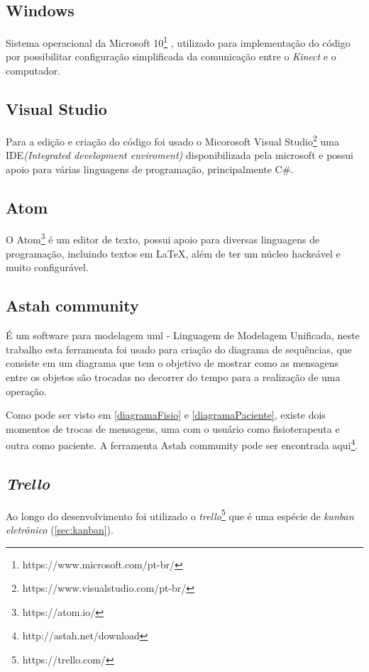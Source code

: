     \subsection{Windows}\label{sub:windows}
    Sistema operacional da Microsoft 10\footnote{https://www.microsoft.com/pt-br/} , utilizado para implementação do código
    por possibilitar configuração simplificada da comunicação entre o \textit{Kinect} e o computador.

     \subsection{Visual Studio}\label{sub:codigo}
       Para a edição e criação do código foi usado o Micorosoft Visual Studio\footnote{https://www.visualstudio.com/pt-br/} uma IDE\textit{(Integrated development enviroment)} disponibilizada pela microsoft
    e possui apoio para várias linguagens de programação, principalmente C\#.

    \subsection{Atom}\label{sub:atom}
    		O Atom\footnote{https://atom.io/} é um editor de texto, possui apoio para diversas linguagens de programação, incluindo textos em LaTeX, além de
    ter um núcleo hackeável e muito configurável.



    \subsection{Astah community}\label{sub:diagramaSequencia}
      É um software para modelagem uml - Linguagem de Modelagem Unificada, neste trabalho esta ferramenta foi usado para criação do diagrama de sequências, que consiste em um diagrama que tem o objetivo de mostrar como as mensagens entre os objetos são trocadas no decorrer do tempo para a realização de uma operação\cite{diagramaSequencia}.

    Como pode ser visto em \ref{diagramaFisio} e \ref{diagramaPaciente}, existe dois momentos de trocas de mensagens, uma com o usuário como fisioterapeuta e outra
    como paciente. A ferramenta Astah community pode ser encontrada aqui\footnote{http://astah.net/download}.


    \subsection{\textit{Trello}}\label{sub:trello}
      Ao longo do desenvolvimento foi utilizado o \textit{trello}\footnote{https://trello.com/}  que é uma espécie de \textit{kanban eletrônico} (\ref{sec:kanban}).
